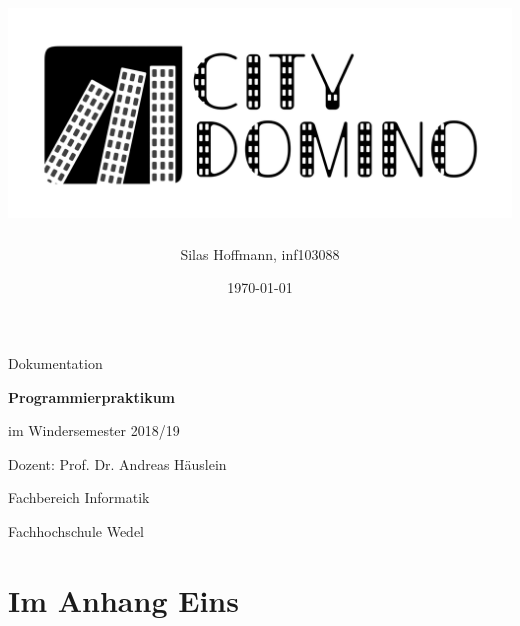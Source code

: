 \documentclass[a4paper]{scrartcl}
\title{\includegraphics[width=\linewidth]{pics/LogoIconLargeV1}}
\author{Silas Hoffmann, inf103088}
\date{\today}
\begin{document}
\maketitle

\vfill
\begin{center}
	Dokumentation
	
	\vspace{0.5cm}
	\Large
	\textbf{Programmierpraktikum}
	\normalsize
	
	\vspace{0.3cm}
	im Windersemester 2018/19
	
	\vspace{0.5cm}
	Dozent: Prof. Dr. Andreas Häuslein
	
	\vfill
	\small
	Fachbereich Informatik
	
	\vspace{0.3cm}
	Fachhochschule Wedel
\end{center}


\thispagestyle{empty}

\newpage
\tableofcontents
\newpage

\blindtext




\clearpage
\appendix
{}
\thispagestyle{plain}
\section{Im Anhang Eins}
\end{document}
